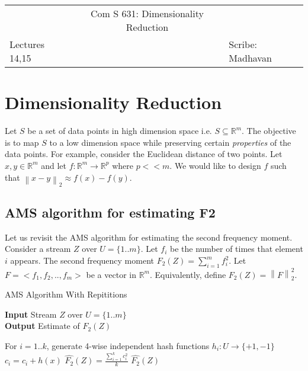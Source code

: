 \documentclass[11pt]{article}
\newcommand{\norm}[1]{\left\lVert#1\right\rVert}
\begin{document}
\begin{center}
\begin{tabular} {|lcl|}
\hline
& Com S 631: Dimensionality Reduction & \\
Lectures 14,15 & & Scribe: Madhavan \\
\hline
\end{tabular}
\end{center}


\section{Dimensionality Reduction}

Let $S$ be a set of data points in high dimension space i.e. $S\subseteq \mathbb{R}^m$. The objective is to map $S$ to a low dimension space while preserving certain \emph{properties} of the data points. For example, consider the Euclidean distance of two points. Let $x,y\in \mathbb{R}^m$ and let $f:\mathbb{R}^m\to \mathbb{R}^p$ where $p<<m$. We would like to design $f$ such that $\norm{x-y}_2 \approx f(x)-f(y)$. 
\smallskip
\subsection{AMS algorithm for estimating F2}
Let us revisit the AMS algorithm for estimating the second frequency moment. Consider a stream $Z$ over $U=\{1..m\}$. Let $f_i$ be the number of times that element $i$ appears. The second frequency moment $F_2(Z)=\sum_{i=1}^{m}f_i^2$. Let $F=<f_1, f_2, .. , f_m> $ be a vector in $\mathbb{R}^m$. Equivalently, define $F_2(Z)=\norm{F}_2^2$. 

\begin{algorithm}
\caption{AMS Algorithm With Repititions}
 \hspace*{\algorithmicindent} \textbf{Input} Stream $Z$ over $U=\{1..m\}$ \\
 \hspace*{\algorithmicindent} \textbf{Output} Estimate of $F_2(Z)$
\label{alg:amsrep}
\begin{algorithmic}[1]
    \State For $i=1..k$, generate 4-wise independent hash functions $h_i:U\to \{+1,-1\}$
            \State $c_i=c_i + h(x)$
        \EndFor
    \EndFor
    \State $\hat{F_2}(Z)=\frac{\sum_{i=1}^{k}c_i^2}{k}$
\State \Return $\hat{F_2}(Z)$
\EndProcedure
\end{algorithmic}
\end{algorithm}
\end{document}

